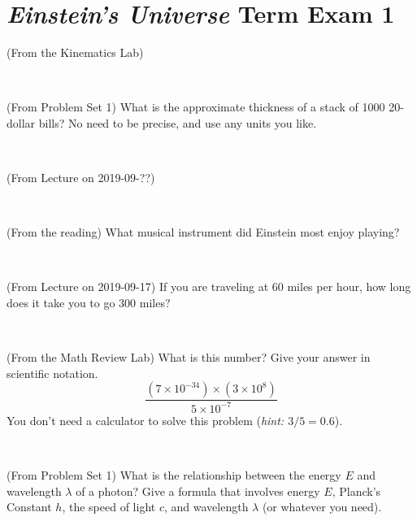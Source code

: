 \documentclass[12pt, letterpaper]{article}
\begin{document}
\section*{\textsl{Einstein's Universe} Term Exam 1}
\setcounter{problem}{1}


\begin{problem} (From the Kinematics Lab)

\end{problem}


\vfill ~

\begin{problem} (From Problem Set 1)
What is the approximate thickness of a stack of 1000 20-dollar bills?
No need to be precise, and use any units you like.
\end{problem}


\vfill ~

\begin{problem} (From Lecture on 2019-09-??)
\end{problem}


\vfill ~

\begin{problem} (From the reading)
What musical instrument did Einstein most enjoy playing?
\end{problem}


\vfill ~


\clearpage


\begin{problem} (From Lecture on 2019-09-17)
If you are traveling at 60 miles per hour, how long does
it take you to go 300 miles?
\end{problem}


\vfill ~

\begin{problem} (From the Math Review Lab)
What is this number? Give your answer in scientific notation.
$$
\frac{(7\times10^{-34})\times(3\times10^8)}{5\times10^{-7}}
$$
You don't need a calculator to solve this problem (\textit{hint: $3/5=0.6$}).
\end{problem}


\vfill ~

\begin{problem} (From Problem Set 1)
What is the relationship between the energy $E$ and wavelength
$\lambda$ of a photon? Give a formula that involves energy $E$,
Planck's Constant $h$, the speed of light $c$, and wavelength
$\lambda$ (or whatever you need).
\end{problem}
\end{document}
